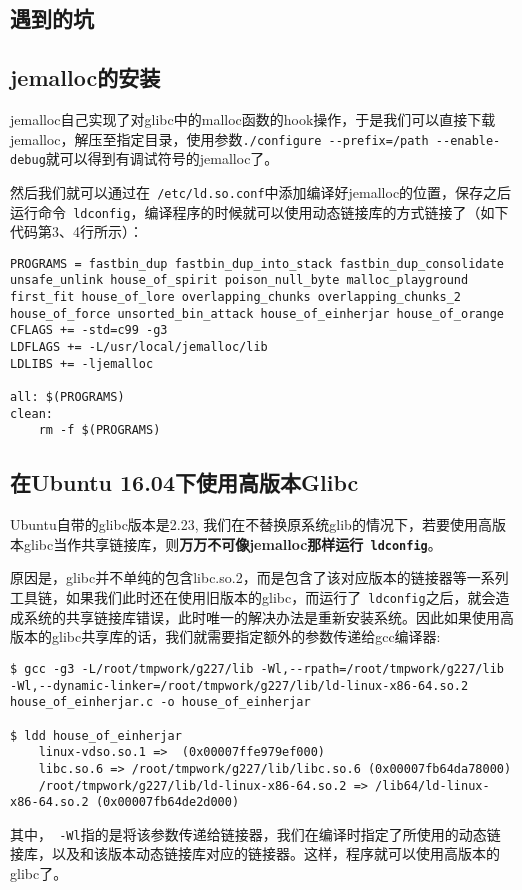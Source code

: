 \begin{center}
    \section{遇到的坑}
\end{center}

\setlength{\parindent}{2em}
\subsection{jemalloc的安装}
jemalloc自己实现了对glibc中的malloc函数的hook操作，于是我们可以直接下载jemalloc，解压至指定目录，使用参数\Verb+./configure --prefix=/path --enable-debug+就可以得到有调试符号的jemalloc了。

然后我们就可以通过在\Verb+ /etc/ld.so.conf+中添加编译好jemalloc的位置，保存之后运行命令\Verb+ ldconfig+，编译程序的时候就可以使用动态链接库的方式链接了（如下代码第3、4行所示）：
\begin{verbatim}
PROGRAMS = fastbin_dup fastbin_dup_into_stack fastbin_dup_consolidate unsafe_unlink house_of_spirit poison_null_byte malloc_playground first_fit house_of_lore overlapping_chunks overlapping_chunks_2 house_of_force unsorted_bin_attack house_of_einherjar house_of_orange
CFLAGS += -std=c99 -g3
LDFLAGS += -L/usr/local/jemalloc/lib
LDLIBS += -ljemalloc

all: $(PROGRAMS)
clean:
    rm -f $(PROGRAMS)
\end{verbatim}

\subsection{在Ubuntu 16.04下使用高版本Glibc}
Ubuntu自带的glibc版本是2.23, 我们在不替换原系统glib的情况下，若要使用高版本glibc当作共享链接库，则\textbf{万万不可像jemalloc那样运行\Verb+ ldconfig+}。

原因是，glibc并不单纯的包含libc.so.2，而是包含了该对应版本的链接器等一系列工具链，如果我们此时还在使用旧版本的glibc，而运行了\Verb+ ldconfig+之后，就会造成系统的共享链接库错误，此时唯一的解决办法是重新安装系统。因此如果使用高版本的glibc共享库的话，我们就需要指定额外的参数传递给gcc编译器: 
\begin{verbatim}
$ gcc -g3 -L/root/tmpwork/g227/lib -Wl,--rpath=/root/tmpwork/g227/lib -Wl,--dynamic-linker=/root/tmpwork/g227/lib/ld-linux-x86-64.so.2 house_of_einherjar.c -o house_of_einherjar

$ ldd house_of_einherjar                                                                                                                                                   
    linux-vdso.so.1 =>  (0x00007ffe979ef000)
    libc.so.6 => /root/tmpwork/g227/lib/libc.so.6 (0x00007fb64da78000)
    /root/tmpwork/g227/lib/ld-linux-x86-64.so.2 => /lib64/ld-linux-x86-64.so.2 (0x00007fb64de2d000)

\end{verbatim}

其中，\Verb+ -Wl+指的是将该参数传递给链接器，我们在编译时指定了所使用的动态链接库，以及和该版本动态链接库对应的链接器。这样，程序就可以使用高版本的glibc了。

\newpage
